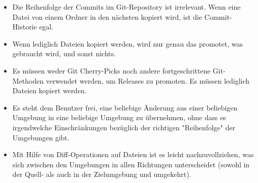 \begin{itemize}
	\item Die Reihenfolge der Commits im Git-Repository ist irrelevant. Wenn eine Datei von einem Ordner in den nächsten kopiert wird, ist die Commit-Historie egal.
	\item Wenn lediglich Dateien kopiert werden, wird nur genau das promotet, was gebraucht wird, und sonst nichts.
	\item Es müssen weder Git Cherry-Picks noch andere fortgeschrittene Git-Methoden verwendet werden, um Releases zu promoten. Es müssen lediglich Dateien kopiert werden.
	\item Es steht dem Benutzer frei, eine beliebige Änderung aus einer beliebigen Umgebung in eine beliebige Umgebung zu übernehmen, ohne dass es irgendwelche Einschränkungen bezüglich der richtigen "Reihenfolge" der Umgebungen gibt.
	\item Mit Hilfe von Diff-Operationen auf Dateien ist es leicht nachzuvollziehen, was sich zwischen den Umgebungen in allen Richtungen unterscheidet (sowohl in der Quell- als auch in der Zielumgebung und umgekehrt).
\end{itemize}









